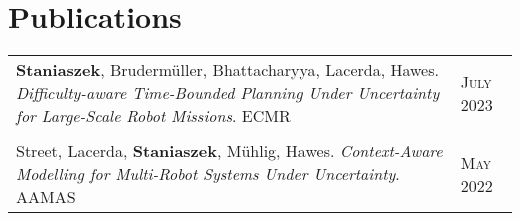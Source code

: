 \documentclass[a4paper,10pt]{article}
\newcommand{\datelen}{1.8cm}
\newcommand{\descrlen}{15.5cm}
\begin{document}
\section{Publications}
\begin{tabular}{p{\descrlen}|p{\datelen}}
  \textbf{Staniaszek}, Brudermüller, Bhattacharyya, Lacerda, Hawes. \emph{Difficulty-aware Time-Bounded Planning Under Uncertainty for Large-Scale Robot Missions}. ECMR&\textsc{July 2023}\\\multicolumn{2}{c}{}\\[-0.2cm]
  Street, Lacerda, \textbf{Staniaszek}, Mühlig, Hawes. \emph{Context-Aware Modelling for Multi-Robot Systems Under Uncertainty}. AAMAS & \textsc{May 2022}\\

\end{tabular}
\end{document}
